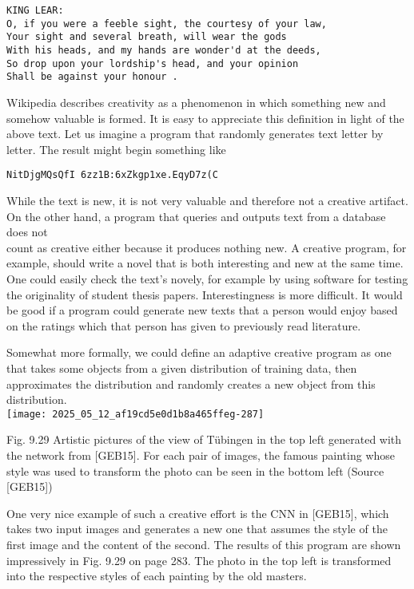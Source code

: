 \documentclass[10pt]{article}
\begin{document}
\begin{verbatim}
KING LEAR:
O, if you were a feeble sight, the courtesy of your law,
Your sight and several breath, will wear the gods
With his heads, and my hands are wonder'd at the deeds,
So drop upon your lordship's head, and your opinion
Shall be against your honour .
\end{verbatim}

Wikipedia describes creativity as a phenomenon in which something new and somehow valuable is formed. It is easy to appreciate this definition in light of the above text. Let us imagine a program that randomly generates text letter by letter. The result might begin something like

\begin{verbatim}
NitDjgMQsQfI 6zz1B:6xZkgp1xe.EqyD7z(C
\end{verbatim}

While the text is new, it is not very valuable and therefore not a creative artifact. On the other hand, a program that queries and outputs text from a database does not\\
count as creative either because it produces nothing new. A creative program, for example, should write a novel that is both interesting and new at the same time. One could easily check the text's novely, for example by using software for testing the originality of student thesis papers. Interestingness is more difficult. It would be good if a program could generate new texts that a person would enjoy based on the ratings which that person has given to previously read literature.

Somewhat more formally, we could define an adaptive creative program as one that takes some objects from a given distribution of training data, then approximates the distribution and randomly creates a new object from this distribution.\\
\texttt{[image: 2025\_05\_12\_af19cd5e0d1b8a465ffeg-287]}

Fig. 9.29 Artistic pictures of the view of Tübingen in the top left generated with the network from [GEB15]. For each pair of images, the famous painting whose style was used to transform the photo can be seen in the bottom left (Source [GEB15])

One very nice example of such a creative effort is the CNN in [GEB15], which takes two input images and generates a new one that assumes the style of the first image and the content of the second. The results of this program are shown impressively in Fig. 9.29 on page 283. The photo in the top left is transformed into the respective styles of each painting by the old masters.
\end{document}
